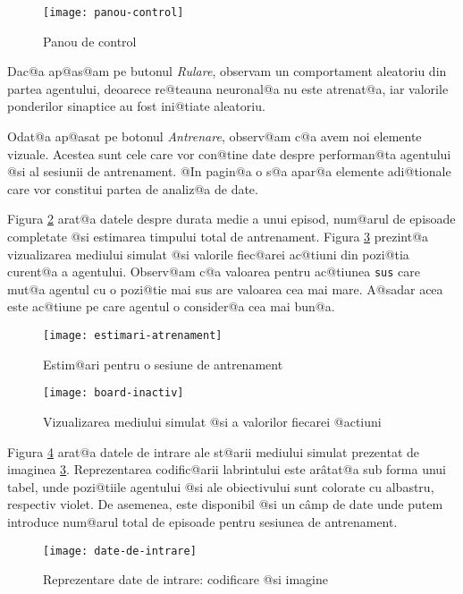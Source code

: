 \begin{figure}[h]
	\centering
	\texttt{[image: panou-control]}
	\caption{Panou de control}
	\label{fig:panou-control}
\end{figure}

Dac@a ap@as@am pe butonul \textsl{Rulare}, observam un comportament aleatoriu din partea agentului, deoarece re@teauna neuronal@a nu este atrenat@a, iar valorile ponderilor sinaptice au fost ini@tiate aleatoriu.

Odat@a ap@asat pe botonul \textsl{Antrenare}, observ@am c@a avem noi elemente vizuale. Acestea sunt cele care vor con@tine date despre performan@ta agentului @si al sesiunii de antrenament. @In pagin@a o s@a apar@a elemente adi@tionale care vor constitui partea de  analiz@a de date. 

Figura \ref{fig:estimari-antrenament} arat@a datele despre durata medie a unui episod, num@arul de episoade completate @si estimarea timpului total de antrenament. Figura \ref{fig:board-inactiv} prezint@a vizualizarea mediului simulat @si valorile fiec@arei ac@tiuni din pozi@tia curent@a a agentului. Observ@am c@a valoarea pentru ac@tiunea \texttt{sus} care mut@a agentul cu o pozi@tie mai sus are valoarea cea mai mare. A@sadar acea este ac@tiune pe care agentul o consider@a cea mai bun@a. 

\begin{figure}[h]
	\centering
	\texttt{[image: estimari-atrenament]}
	\caption{Estim@ari pentru o sesiune de antrenament}
	\label{fig:estimari-antrenament}
\end{figure}

\begin{figure}[h]
	\centering
	\texttt{[image: board-inactiv]}
	\caption{Vizualizarea mediului simulat @si a valorilor fiecarei @actiuni}
	\label{fig:board-inactiv}
\end{figure}

Figura \ref{fig:date-de-intrare} arat@a datele de intrare ale st@arii mediului simulat prezentat de imaginea \ref{fig:board-inactiv}. Reprezentarea codific@arii labrintului este ar\^ atat@a sub forma unui tabel, unde pozi@tiile agentului @si ale obiectivului sunt colorate cu albastru, respectiv violet. De asemenea, este disponibil @si un c\^ amp de date unde putem introduce num@arul total de episoade pentru sesiunea de antrenament.

\begin{figure}[h]
	\centering
	\texttt{[image: date-de-intrare]}
	\caption{Reprezentare date de intrare: codificare @si imagine}
	\label{fig:date-de-intrare}
\end{figure}

